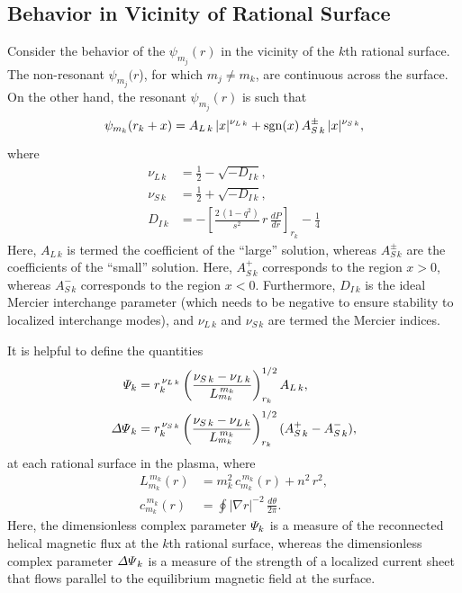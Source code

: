 \documentclass[12pt,prb,aps]{revtex4-1}
\begin{document}
\subsection{Behavior in Vicinity of Rational Surface}\label{rational}
Consider the behavior of the $\psi_{m_j}(r)$ in the vicinity of the $k$th rational surface. 
The non-resonant $\psi_{m_j}(r$), for which $m_j\neq m_k$,   are continuous across the surface. On the other hand, the resonant $\psi_{m_j}(r)$ is
such that
\begin{align}\label{rat}
\psi_{m_k}(r_k+x) &= A_{L\,k}\,|x|^{\nu_{L\,k}} + {\rm sgn}(x)\,A_{S\,k}^{\pm}\,|x|^{\nu_{S\,k}},\\[0.5ex]
\end{align}
where
\begin{align}
\nu_{L\,k} &= \frac{1}{2}-\sqrt{-D_{I\,k}},\\[0.5ex]
\nu_{S\,k} &= \frac{1}{2}+\sqrt{-D_{I\,k}},\\[0.5ex]
D_{I\,k}&= - \left[\frac{2\,(1-q^2)}{s^2}\,r\,\frac{dP}{dr}\right]_{r_k} -\frac{1}{4}\label{di}
\end{align}
Here,  $A_{L\,k}$ is termed the coefficient of the ``large'' solution, whereas $A_{S\,k}^\pm$ are the coefficients of the ``small'' solution.
Here, $A_{S\,k}^+$ corresponds to the region $x>0$, whereas  $A_{S\,k}^-$ corresponds to the region $x<0$. Furthermore, $D_{I\,k}$ is the ideal
Mercier interchange parameter (which needs to be negative to ensure stability to localized interchange modes),\cite{mercier,ggj,ggj1} and $\nu_{L\,k}$ and $\nu_{S\,k}$
are termed the Mercier indices. 

It is helpful to define the quantities\,\cite{tear9}
\begin{align}\label{Psidef}
{\mit\Psi}_k&= r_k^{\,\nu_{L\,k}}\left(\frac{\nu_{S\,k}-\nu_{L\,k}}{L_{m_k}^{\,{m_k}}}\right)^{1/2}_{r_k} A_{L\,k},\\[0.5ex]
{\mit\Delta\Psi}_k &= r_k^{\,\nu_{S\,k}}\left(\frac{\nu_{S\,k}-\nu_{L\,k}}{L_{m_k}^{\,m_k}}\right)^{1/2}_{r_k} (A_{S\,k}^+-A_{S\,k}^-),\label{edpp}
\end{align}
at each rational surface in the plasma, where
\begin{align}
L_{m_k}^{\,m_k}(r) &= m_k^2\,c_{m_k}^{\,m_k}(r) + n^2\,r^2,\\[0.5ex]
c_{m_k}^{\,m_k}(r) &=\oint|\nabla r|^{-2}\,\frac{d\theta}{2\pi}.
\end{align}
 Here, the dimensionless complex parameter ${\mit\Psi}_k$ is a measure of the reconnected helical magnetic flux at the $k$th rational surface, whereas
the dimensionless complex parameter ${\mit\Delta\Psi}_k$ is a measure of the strength of a localized current sheet that flows parallel to the equilibrium magnetic field at the surface.
\end{document}
